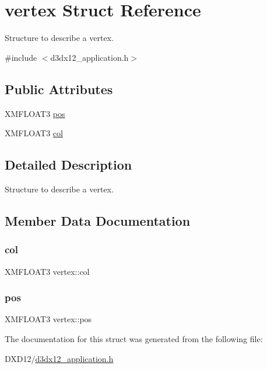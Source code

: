 \hypertarget{structvertex}{}\section{vertex Struct Reference}
\label{structvertex}


Structure to describe a vertex.  




{\ttfamily \#include $<$d3dx12\+\_\+application.\+h$>$}

\subsection*{Public Attributes}
\begin{DoxyCompactItemize}
\item 
X\+M\+F\+L\+O\+A\+T3 \mbox{\hyperlink{structvertex_aba6ddcf7ce1a3583a95bed1a17ab6eaa}{pos}}
\item 
X\+M\+F\+L\+O\+A\+T3 \mbox{\hyperlink{structvertex_abf4ce40b45dc3a4e7bc23d3e565081f3}{col}}
\end{DoxyCompactItemize}


\subsection{Detailed Description}
Structure to describe a vertex. 

\subsection{Member Data Documentation}
\mbox{\label{structvertex_abf4ce40b45dc3a4e7bc23d3e565081f3}} 
\subsubsection{\texorpdfstring{col}{col}}
{\footnotesize\ttfamily X\+M\+F\+L\+O\+A\+T3 vertex\+::col}

\mbox{\label{structvertex_aba6ddcf7ce1a3583a95bed1a17ab6eaa}} 
\subsubsection{\texorpdfstring{pos}{pos}}
{\footnotesize\ttfamily X\+M\+F\+L\+O\+A\+T3 vertex\+::pos}



The documentation for this struct was generated from the following file\+:\begin{DoxyCompactItemize}
\item 
D\+X\+D12/\mbox{\hyperlink{d3dx12__application_8h}{d3dx12\+\_\+application.\+h}}\end{DoxyCompactItemize}
